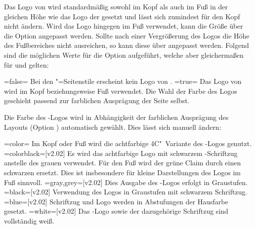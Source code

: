 \begin{DeclareEntity*}{}
\begin{DeclareEntity*}{}
\begin{DeclareEntity*}{}
\begin{Declaration}
\begin{Declaration}
\begin{Declaration}
Das Logo von \DDC wird standardmäßig sowohl im Kopf als auch im Fuß in der 
gleichen Höhe wie das Logo der \TnUD gesetzt und lässt sich zumindest für den 
Kopf nicht ändern. Wird das Logo hingegen im Fuß verwendet, kann die Größe über 
die Option  angepasst werden. Sollte nach einer 
Vergrößerung des Logos die Höhe des Fußbereiches nicht ausreichen, so kann 
diese über  angepasst werden. Folgend sind 
die möglichen Werte für die Option  aufgeführt, welche aber 
gleichermaßen für  und  gelten:
%
\begin{DeclareValues}
\itemval=false=
  Bei den "=Seitenstile erscheint kein Logo von \DDC.
\itemval*=true=
  Das Logo von \DDC wird im Kopf beziehungsweise Fuß verwendet. Die Wahl der 
  Farbe des Logos geschieht passend zur farblichen Ausprägung der Seite selbst.
\end{DeclareValues}
%
Die Farbe des \DDC-Logos wird in Abhängigkeit der farblichen Ausprägung des 
Layouts (Option ) automatisch gewählt. Dies lässt sich 
manuell ändern:
%
\begin{DeclareValues}
\itemval=color=
  Im Kopf oder Fuß wird die achtfarbige 4C"~Variante des \DDC-Logos genutzt.
\itemval=colorblack=[v2.02]
  Es wird das achtfarbige Logo mit schwarzem \DDC-Schriftzug anstelle des 
  grauen verwendet. Für den Fuß wird der grüne Claim durch einen schwarzen 
  ersetzt. Dies ist insbesondere für kleine Darstellungen des Logos im Fuß 
  sinnvoll.
\itemval=gray,grey=[v2.02]
  Dies Ausgabe des \DDC-Logos erfolgt in Graustufen.
\itemval=black=[v2.02]
  Verwendung des Logos in Graustufen mit schwarzem Schriftzug.
\itemval=blue=[v2.02]
  Schriftzug und Logo werden in Abstufungen der Hausfarbe  gesetzt.
\itemval=white=[v2.02]
  Das \DDC-Logo sowie der dazugehörige Schriftzug sind vollständig weiß.
\end{DeclareValues}
%
\end{Declaration}
\end{Declaration}
\end{Declaration}


\end{DeclareEntity*}
\end{DeclareEntity*}
\end{DeclareEntity*}
